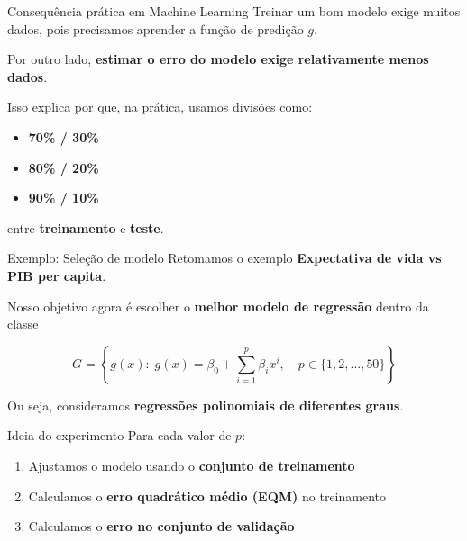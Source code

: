 \documentclass[
  ignorenonframetext,
  aspectratio=169,
]{beamer}
\providecommand{\tightlist}{%
  \setlength{\itemsep}{0pt}\setlength{\parskip}{0pt}}
\begin{document}
\begin{frame}
\begin{block}{Consequência prática em Machine Learning}
\label{consequuxeancia-pruxe1tica-em-machine-learning}
Treinar um bom modelo exige muitos dados, pois precisamos aprender a
função de predição \(g\).

Por outro lado, \textbf{estimar o erro do modelo exige relativamente
menos dados}.

Isso explica por que, na prática, usamos divisões como:

\begin{itemize}
\tightlist
\item
  \textbf{70\% / 30\%}
\item
  \textbf{80\% / 20\%}
\item
  \textbf{90\% / 10\%}
\end{itemize}

entre \textbf{treinamento} e \textbf{teste}.
\end{block}
\end{frame}

\begin{frame}{Exemplo: Seleção de modelo}
\label{exemplo-seleuxe7uxe3o-de-modelo}
Retomamos o exemplo \textbf{Expectativa de vida vs PIB per capita}.

Nosso objetivo agora é escolher o \textbf{melhor modelo de regressão}
dentro da classe

\[
G =
\left\{
g(x):\;
g(x) =
\beta_0 +
\sum_{i=1}^{p}
\beta_i x^i,
\quad
p \in \{1,2,\ldots,50\}
\right\}
\]

Ou seja, consideramos \textbf{regressões polinomiais de diferentes
graus}.
\end{frame}

\begin{frame}
\begin{block}{Ideia do experimento}
\label{ideia-do-experimento}
Para cada valor de \(p\):

\begin{enumerate}
\tightlist
\item
  Ajustamos o modelo usando o \textbf{conjunto de treinamento}\\
\item
  Calculamos o \textbf{erro quadrático médio (EQM)} no treinamento\\
\item
  Calculamos o \textbf{erro no conjunto de validação}
\end{enumerate}
\end{block}
\end{frame}
\end{document}
